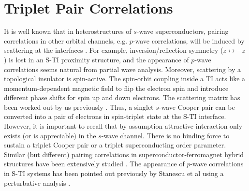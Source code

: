\section{Triplet Pair Correlations}

It is well known that in heterostructures of $s$-wave superconductors,
pairing correlations in other orbital channels, e.g. $p$-wave correlations, 
will be induced by scattering at the interfaces \cite{esch,tanaka}. For example,
inversion/reflection symmetry ($z\leftrightarrow -z$) is lost in an S-TI proximity 
structure, and the appearance of $p$-wave correlations seems natural from
 partial wave analysis. Moreover, scattering by a topological insulator is 
spin-active. The spin-orbit coupling inside a TI acts like a momentum-dependent
magnetic field to flip the electron spin and introduce different phase shifts
for spin up and down electrons. The scattering matrix has been worked out by us 
previously \cite{zhao}. Thus, a singlet $s$-wave Cooper pair can be converted into a pair
of electrons in spin-triplet state at the S-TI interface.
However, it is important to recall that by assumption attractive interaction only exists
(or is appreciable) in the $s$-wave channel. There is no binding force
to sustain a triplet Cooper pair or a triplet superconducting order parameter. 
%
Similar (but different) pairing correlations in superconductor-ferromagnet
hybrid structures have been extensively studied \cite{esch}. 
The appearance of $p$-wave correlations in S-TI systems
has been pointed out previously by Stanescu et al using a perturbative analysis \cite{stan}.

